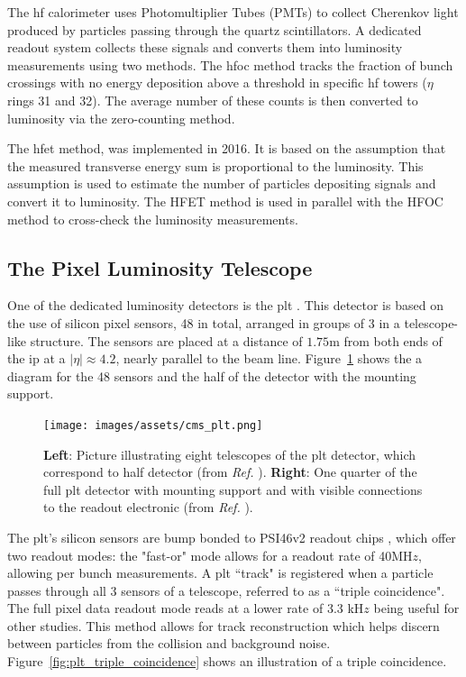 The \acrshort{hf} calorimeter uses Photomultiplier Tubes (PMTs) to collect Cherenkov light produced by particles passing through the quartz scintillators. A dedicated readout system collects these signals and converts them into luminosity measurements using two methods. The \acrshort{hfoc} method tracks the fraction of bunch crossings with no energy deposition above a threshold in specific \acrshort{hf} towers ($\eta$ rings 31 and 32). The average number of these counts is then converted to luminosity via the zero-counting method.

The \acrshort{hfet} method, was implemented in 2016. It is based on the assumption that the measured transverse energy sum is proportional to the luminosity. This assumption is used to estimate the number of particles depositing signals and convert it to luminosity. The HFET method is used in parallel with the HFOC method to cross-check the luminosity measurements.

\subsection{The Pixel Luminosity Telescope}
\label{subsubsec:plt}

One of the dedicated luminosity detectors is the \acrfull{plt} \cite{CMS-DP-2021-020}. This detector is based on the use of silicon pixel sensors, 48 in total, arranged in groups of 3 in a telescope-like structure. The sensors are placed at a distance of $1.75$m from both ends of the \acrshort{ip} at a $|\eta| \approx 4.2$, nearly parallel to the beam line. Figure~\ref{fig:cms_plt} shows the a diagram for the 48 sensors and the half of the detector with the mounting support.

\begin{figure}[H]
	\centering
	\texttt{[image: images/assets/cms\_plt.png]}
	\caption[PLT detector telescopes]{\textbf{Left}: Picture illustrating eight telescopes of the \acrshort{plt} detector, which correspond to half detector (from \textit{Ref.} \cite{Romeo:2797807}). \textbf{Right}: One quarter of the full \acrshort{plt} detector with mounting support and with visible connections to the readout electronic (from \textit{Ref.} \cite{DelannoySotomayor:2765247}).}
	\label{fig:cms_plt}
\end{figure}

The \acrshort{plt}'s silicon sensors are bump bonded to PSI46v2 readout chips \cite{KASTLI2006188}, which offer two readout modes: the "fast-or" mode allows for a readout rate of 40MH$z$, allowing per bunch measurements. A \acrshort{plt} ``track" is registered when a particle passes through all 3 sensors of a telescope, referred to as a ``triple coincidence". The full pixel data readout mode reads at a lower rate of 3.3 kH$z$ being useful for other studies. This method allows for track reconstruction which helps discern between particles from the collision and background noise. Figure~\ref{fig:plt_triple_coincidence} shows an illustration of a triple coincidence.

